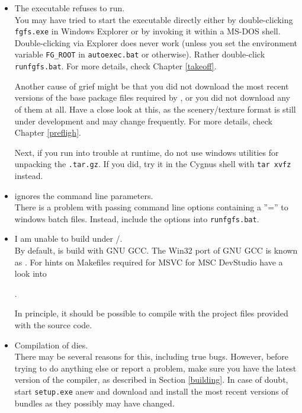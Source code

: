 \begin{itemize}
\item{The executable refuses to run.}\\
 You may have tried to start the executable directly either by
 double-clicking \texttt{fgfs.exe} in Windows Explorer or by invoking it
 within a MS-DOS shell. Double-clicking via Explorer does never work
 (unless you set the environment variable \texttt{FG\_ROOT}
 in \texttt{autoexec.bat} or otherwise). Rather double-click \texttt{runfgfs.bat}.
  For more details, check Chapter \ref{takeoff}.

 Another cause of grief might be that you did not download the
 most recent versions of the base package files required by \FlightGear{}$\!$, or
 you did not download any of them at all. Have a close look
 at this, as the scenery/texture format is still under development and may
 change frequently.  For more details, check Chapter \ref{prefligh}.

 Next, if you run into trouble at runtime, do not use windows utilities for unpacking the
 \texttt{.tar.gz}. If you did, try it in the Cygnus shell with \texttt{tar xvfz}
 instead.

\item{\FlightGear{} ignores the command line parameters.}\\
 There is a problem with passing command line options containing a
 ''='' to windows batch files. Instead, include the options into
 \texttt{runfgfs.bat}.

\item{I am unable to build \FlightGear{} under /.}\\
 By default, \FlightGear{} is build with GNU GCC. The Win32 port of GNU GCC is known as
 . For hints on Makefiles
 required for MSVC for MSC DevStudio have a look into
  \medskip

 .
  \medskip

 \noindent
In principle, it should be possible to compile \FlightGear{} with the project files provided with the source code.

\item{Compilation of \FlightGear{} dies.}\\
 There may be several reasons for this, including true bugs. However, before trying to do
 anything else or report a problem, make sure you have the latest version of the
 \Cygwin{} compiler, as described in Section \ref{building}. In case of doubt, start
 \texttt{setup.exe} anew and download and install the most recent versions of bundles
 as they possibly may have changed.
\end{itemize}


